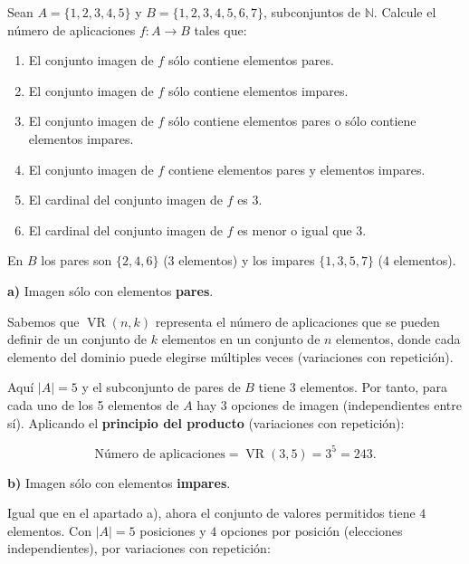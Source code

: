 \documentclass[a4paper,12pt]{article}
\begin{document}
\begin{ejercicio}[title=Ejercicio 20]
Sean $A = \{1,2,3,4,5\}$ y $B = \{1,2,3,4,5,6,7\}$, subconjuntos de $\mathbb{N}$. Calcule el número de aplicaciones $f : A \to B$ tales que:

\begin{enumerate}
\item[a)] El conjunto imagen de $f$ sólo contiene elementos pares.
\item[b)] El conjunto imagen de $f$ sólo contiene elementos impares.
\item[c)] El conjunto imagen de $f$ sólo contiene elementos pares o sólo contiene elementos impares.
\item[d)] El conjunto imagen de $f$ contiene elementos pares y elementos impares.
\item[e)] El cardinal del conjunto imagen de $f$ es $3$.
\item[f)] El cardinal del conjunto imagen de $f$ es menor o igual que $3$.
\end{enumerate}

\tcblower

En $B$ los pares son $\{2,4,6\}$ (3 elementos) y los impares $\{1,3,5,7\}$ (4 elementos).

\medskip
\textbf{a)} Imagen sólo con elementos \textbf{pares}.

\vspace{0.5em}

Sabemos que $\operatorname{VR}(n,k)$ representa el número de aplicaciones que se pueden definir de un conjunto de $k$ elementos en un conjunto de $n$ elementos, donde cada elemento del dominio puede elegirse múltiples veces (variaciones con repetición).  

\vspace{0.5em}

Aquí $|A|=5$ y el subconjunto de pares de $B$ tiene $3$ elementos. Por tanto, para cada uno de los 5 elementos de $A$ hay 3 opciones de imagen (independientes entre sí). Aplicando el \textbf{principio del producto} (variaciones con repetición):

\[
\text{Número de aplicaciones} = \operatorname{VR}(3,5) = 3^{5} = \boxed{243}.
\]

\vspace{0.5em}

\textbf{b)} Imagen sólo con elementos \textbf{impares}.

\vspace{0.5em}

Igual que en el apartado a), ahora el conjunto de valores permitidos tiene $4$ elementos. Con $|A|=5$ posiciones y $4$ opciones por posición (elecciones independientes), por variaciones con repetición:


\end{ejercicio}
\end{document}
